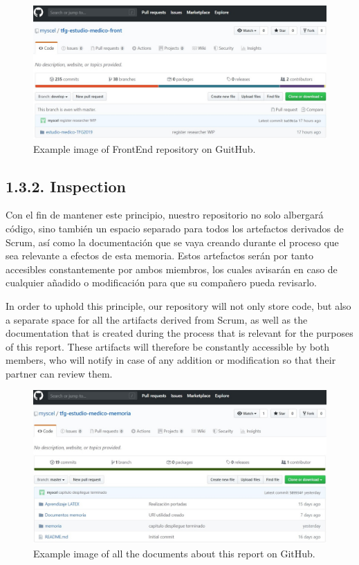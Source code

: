 \begin{itemize}
    \begin{figure}[h]
    \centering
     \includegraphics[width=1\textwidth]{images/GitHubFront.jpg}
    \caption{Example image of FrontEnd repository on GuitHub.}
    \end{figure}
    \end{itemize}
    
    \subsection*{1.3.2. Inspection}
    Con el fin de mantener este principio, nuestro repositorio no solo albergará código, sino también un espacio separado para todos los artefactos derivados de Scrum, así como la documentación que se vaya creando durante el proceso que sea relevante a efectos de esta memoria. Estos artefactos serán por tanto accesibles constantemente por ambos miembros, los cuales avisarán en caso de cualquier añadido o modificación para que su compañero pueda revisarlo.\newpage
    
    In order to uphold this principle, our repository will not only store code, but also a separate space for all the artifacts derived from Scrum, as well as the documentation that is created during the process that is relevant for the purposes of this report. These artifacts will therefore be constantly accessible by both members, who will notify in case of any addition or modification so that their partner can review them.\newline
    
    \begin{figure}[h]
    \centering
     \includegraphics[width=1\textwidth]{images/GitHubMemoria.jpg}
    \caption{Example image of all the documents about this report on GitHub.}
    \end{figure}
    \newpage
    
